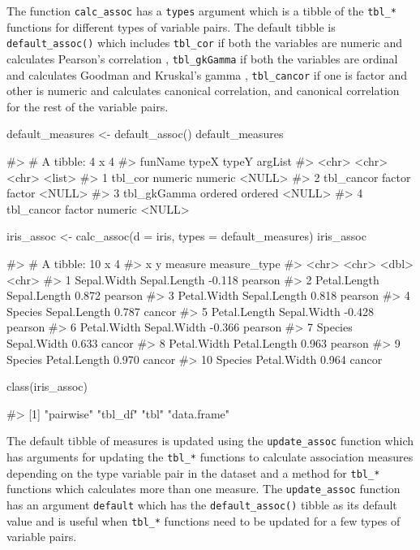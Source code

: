 The function \texttt{calc\_assoc} has a \texttt{types} argument which is
a tibble of the \texttt{tbl\_*} functions for different types of
variable pairs. The default tibble is \texttt{default\_assoc()} which
includes \texttt{tbl\_cor} if both the variables are numeric and
calculates Pearson's correlation , \texttt{tbl\_gkGamma} if both the
variables are ordinal and calculates Goodman and Kruskal's gamma ,
\texttt{tbl\_cancor} if one is factor and other is numeric and
calculates canonical correlation, and canonical correlation for the rest
of the variable pairs.

\begin{Schunk}
\begin{Sinput}
default_measures <- default_assoc()
default_measures
\end{Sinput}
\begin{Soutput}
#> # A tibble: 4 x 4
#>   funName     typeX   typeY   argList
#>   <chr>       <chr>   <chr>   <list> 
#> 1 tbl_cor     numeric numeric <NULL> 
#> 2 tbl_cancor  factor  factor  <NULL> 
#> 3 tbl_gkGamma ordered ordered <NULL> 
#> 4 tbl_cancor  factor  numeric <NULL>
\end{Soutput}
\begin{Sinput}
iris_assoc <- calc_assoc(d = iris,
                         types = default_measures)
iris_assoc
\end{Sinput}
\begin{Soutput}
#> # A tibble: 10 x 4
#>    x            y            measure measure_type
#>    <chr>        <chr>          <dbl> <chr>       
#>  1 Sepal.Width  Sepal.Length  -0.118 pearson     
#>  2 Petal.Length Sepal.Length   0.872 pearson     
#>  3 Petal.Width  Sepal.Length   0.818 pearson     
#>  4 Species      Sepal.Length   0.787 cancor      
#>  5 Petal.Length Sepal.Width   -0.428 pearson     
#>  6 Petal.Width  Sepal.Width   -0.366 pearson     
#>  7 Species      Sepal.Width    0.633 cancor      
#>  8 Petal.Width  Petal.Length   0.963 pearson     
#>  9 Species      Petal.Length   0.970 cancor      
#> 10 Species      Petal.Width    0.964 cancor
\end{Soutput}
\begin{Sinput}
class(iris_assoc)
\end{Sinput}
\begin{Soutput}
#> [1] "pairwise"   "tbl_df"     "tbl"        "data.frame"
\end{Soutput}
\end{Schunk}

The default tibble of measures is updated using the
\texttt{update\_assoc} function which has arguments for updating the
\texttt{tbl\_*} functions to calculate association measures depending on
the type variable pair in the dataset and a method for \texttt{tbl\_*}
functions which calculates more than one measure. The
\texttt{update\_assoc} function has an argument \texttt{default} which
has the \texttt{default\_assoc()} tibble as its default value and is
useful when \texttt{tbl\_*} functions need to be updated for a few types
of variable pairs.

